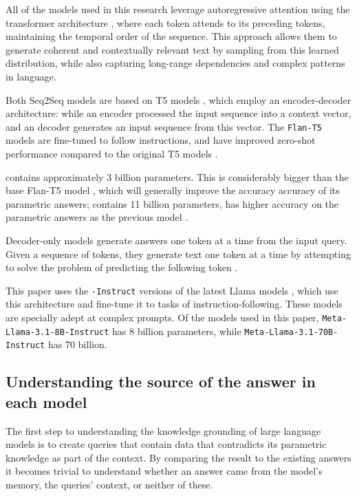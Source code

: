 

All of the models used in this research leverage autoregressive attention using the transformer architecture \cite{attention_is_all_you_need}, where each token attends to its preceding tokens, maintaining the temporal order of the sequence.
This approach allows them to generate coherent and contextually relevant text by sampling from this learned distribution, while also capturing long-range dependencies and complex patterns in language.

Both Seq2Seq models are based on T5 models \cite{t5}, which employ an encoder-decoder architecture: while an encoder processed the input sequence into a context vector, and an decoder generates an input sequence from this vector.
The \texttt{Flan-T5} models are fine-tuned to follow instructions, and have improved zero-shot performance compared to the original T5 models \cite{flant5}.

\smallflan{} contains approximately 3 billion parameters.
This is considerably bigger than the base Flan-T5 model \cite{flant5}, which will generally improve the accuracy accuracy of its parametric answers; \bigflan{} contains 11 billion parameters, has higher accuracy on the parametric answers as the previous model \cite{flant5}.

Decoder-only models generate answers one token at a time from the input query.
Given a sequence of tokens, they generate text one token at a time by attempting to solve the problem of predicting the following token \cite{gpt}.

This paper uses the \texttt{-Instruct} versions of the latest Llama models \cite{llama3}, which use this architecture and fine-tune it to tasks of instruction-following.
These models are specially adept at complex prompts.
Of the models used in this paper, \texttt{Meta-Llama-3.1-8B-Instruct} has 8 billion parameters, while \texttt{Meta-Llama-3.1-70B-Instruct} has 70 billion.

\subsection{Understanding the source of the answer in each model}
\label{query_design}

The first step to understanding the knowledge grounding of large language models is to create queries that contain data that contradicts its parametric knowledge as part of the context.
By comparing the result to the existing answers it becomes trivial to understand whether an answer came from the model's memory, the queries' context, or neither of these.

